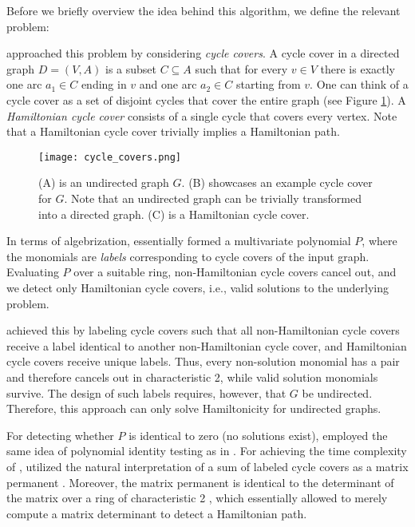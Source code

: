 Before we briefly overview the idea behind this algorithm, we define the 
relevant problem:
\begin{problem}
\end{problem}

\citeauthor{Björklund14} approached this problem by considering \emph{cycle covers}. 
A cycle cover in a directed graph $D = (V, A)$ is a 
subset $C \subseteq A$ such that for every $v \in V$ there is exactly one arc $a_1 \in C$ ending in $v$ 
and one arc $a_2 \in C$ starting from $v$. One can think of a cycle cover as a set of disjoint 
cycles that cover the entire graph (see Figure \ref{fig:cycle_covers}). 
A \emph{Hamiltonian cycle cover} consists of a single cycle that covers every vertex. 
Note that a Hamiltonian cycle cover trivially implies a Hamiltonian path.

\begin{figure}[h]
  \texttt{[image: cycle\_covers.png]}
  \centering
  \caption{(A) is an undirected graph $G$. (B) showcases an example cycle cover for $G$. 
  Note that an undirected graph can be trivially transformed into a directed graph. 
  (C) is a Hamiltonian cycle cover.}
  \label{fig:cycle_covers}
\end{figure}

In terms of algebrization, 
\citeauthor{Björklund14} essentially formed 
a multivariate polynomial $P$, where the monomials are 
\emph{labels} corresponding 
to cycle covers of the input graph. Evaluating $P$ over a suitable ring, 
non-Hamiltonian cycle covers cancel out, and we detect 
only Hamiltonian cycle covers, i.e., valid solutions to the underlying problem.

\citeauthor{Björklund14} achieved this by labeling cycle covers such 
that all non-Hamiltonian cycle covers receive a label identical 
to another non-Hamiltonian cycle cover, 
and Hamiltonian cycle covers receive unique labels. 
Thus, every non-solution monomial has a pair and therefore 
cancels out in characteristic 2, while valid solution monomials survive. 
The design of such labels requires, however, that $G$ be undirected. 
Therefore, this approach can only solve Hamiltonicity for undirected graphs.

For detecting whether $P$ is identical to zero (no solutions exist), \citeauthor{Björklund14} 
employed the same idea of polynomial identity testing as in .
For achieving the time complexity of , \citeauthor{Björklund14} 
utilized the natural interpretation of a sum of labeled cycle covers as 
a matrix permanent \cite{Björklund14}. 
Moreover, the matrix permanent
is identical to the determinant of the matrix 
over a ring of characteristic 2 \cite{Björklund14}, 
which essentially allowed \citeauthor{Björklund14} to merely compute a matrix determinant 
to detect a Hamiltonian path.

